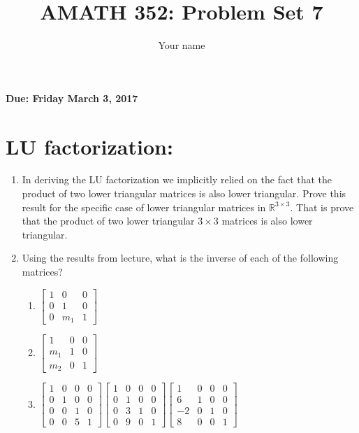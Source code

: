 \documentclass[]{article}
\title{AMATH 352: Problem Set 7}
\author{Your name}
\newcommand{\R}{\mathbb{R}}				%
\newcommand{\bbm}{\begin{bmatrix}}		%
\newcommand{\ebm}{\end{bmatrix}}		%
\begin{document}
\maketitle
    {\Large \textbf{Due: Friday March 3, 2017}} \\

    \section*{LU factorization:}
    \begin{enumerate}
	\item In deriving the LU factorization we implicitly relied on the fact that the product of two lower triangular matrices is also lower triangular. Prove this result for the specific case of lower triangular matrices in $\R^{3\times3}$. That is prove that the product of two lower triangular $3\times3$ matrices is also lower triangular.
	\item Using the results from lecture, what is the inverse of each of the following matrices?
	  \begin{enumerate}
	  \item $\bbm 1&0&0\\0&1&0\\0&m_1&1 \ebm$
	  \item $\bbm 1&0&0\\m_1&1&0\\m_2&0&1 \ebm$
	  \item $\bbm 1&0&0&0\\0&1&0&0\\0&0&1&0\\0&0&5&1 \ebm \bbm 1&0&0&0\\0&1&0&0\\0&3&1&0\\0&9&0&1 \ebm \bbm 1&0&0&0\\6&1&0&0\\-2&0&1&0\\8&0&0&1\ebm $
	  \end{enumerate}


\end{enumerate}
\end{document}
